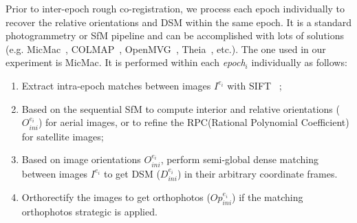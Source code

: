 Prior to inter-epoch rough co-registration, we process each epoch individually to recover the relative orientations and \ac{DSM} within the same epoch. It is a standard photogrammetry or SfM pipeline and can be accomplished with lots of solutions (e.g. MicMac~\cite{deseilligny2011apero}, COLMAP~\cite{schonberger2016structure}, {OpenMVG~\cite{openMVG}, Theia~\cite{theia}, etc.}). The one used in our experiment is MicMac. It is performed within each \textit{epoch$_i$} individually as follows:
\begin{enumerate}
\item Extract intra-epoch matches between images $I^{e_i}$ with SIFT ~\cite{lowe2004distinctive};
\item Based on the sequential SfM to compute interior and relative orientations ({$O_{ini}^{e_i}$}) for aerial images, or to refine the RPC(Rational Polynomial Coefficient) for satellite images;
\item Based on image orientations $O_{ini}^{e_i}$, perform semi-global dense matching~\cite{mpd:06:sgm} {between images $I^{e_i}$} to get {DSM ($D_{ini}^{e_i}$) in their arbitrary coordinate frames.}
\item Orthorectify the images to get orthophotos ($Op_{ini}^{e_i}$) if the matching orthophotos strategic is applied.
\end{enumerate}
